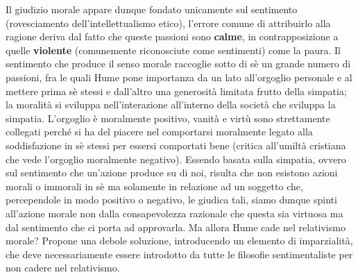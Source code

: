 \documentclass[10pt,a4paper]{article}
\begin{document}
Il giudizio morale appare dunque fondato unicamente sul sentimento (rovesciamento dell'intellettualismo etico), l'errore comune di attribuirlo alla ragione deriva dal fatto che queste passioni sono \textbf{calme}, in contrapposizione a quelle \textbf{violente} (comunemente riconosciute come sentimenti) come la paura. Il sentimento che produce il senso morale raccoglie sotto di sè un grande numero di passioni, fra le quali Hume pone importanza da un lato all'orgoglio personale e al mettere prima sè stessi e dall'altro una generosità limitata frutto della simpatia; la moralità si sviluppa nell'interazione all'interno della società che sviluppa la simpatia. L'orgoglio è moralmente positivo, vanità e virtù sono strettamente collegati perché si ha del piacere nel comportarsi moralmente legato alla soddisfazione in sè stessi per essersi comportati bene (critica all'umiltà cristiana che vede l'orgoglio moralmente negativo). Essendo basata sulla simpatia, ovvero sul sentimento che un'azione produce su di noi, risulta che non esistono azioni morali o immorali in sè ma solamente in relazione ad un soggetto che, percependole in modo positivo o negativo, le giudica tali, siamo dunque spinti all'azione morale non dalla consapevolezza razionale che questa sia virtuosa ma dal sentimento che ci porta ad approvarla. Ma allora Hume cade nel relativismo morale? Propone una debole soluzione, introducendo un elemento di imparzialità, che deve necessariamente essere introdotto da tutte le filosofie sentimentaliste per non cadere nel relativismo.
\end{document}
